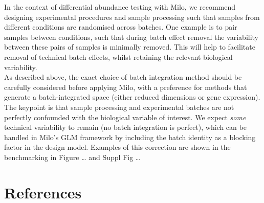 \documentclass[
]{article}
\begin{document}
In the context of differential abundance testing with Milo, we recommend designing experimental procedures and sample processing such that samples from different
conditions are randomised across batches. One example is to pair samples between conditions, such that during batch effect removal the variability between these
pairs of samples is minimally removed. This will help to facilitate removal of technical batch effects, whilst retaining the relevant biological variability.\\
As described above, the exact choice of batch integration method should be carefully considered before applying Milo, with a preference for methods that generate
a batch-integrated space (either reduced dimensions or gene expression). The keypoint is that sample processing and experimental batches are not perfectly
confounded with the biological variable of interest. We expect \emph{some} technical variability to remain (no batch integration is perfect), which can be handled in
Milo's GLM framework by including the batch identity as a blocking factor in the design model. Examples of this correction are shown in the benchmarking in
Figure \ldots{} and Suppl Fig \ldots{}

\hypertarget{references}{%
\section*{References}\label{references}}
\end{document}
